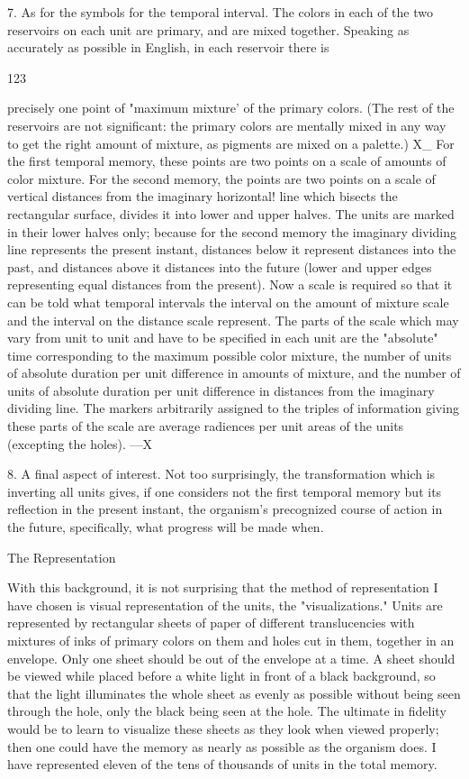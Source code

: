 \documentclass[10pt,twoside]{memoir}
\begin{document}
\begin{enumerate}
{{{{{{{{{{{{{{{{7. As for the symbols for the temporal interval. The colors in each of 
the two reservoirs on each unit are primary, and are mixed together. 
Speaking as accurately as possible in English, in each reservoir there is 


123 


precisely one point of "maximum mixture' of the primary colors. (The rest 
of the reservoirs are not significant: the primary colors are mentally mixed in 
any way to get the right amount of mixture, as pigments are mixed on a 
palette.) X_ For the first temporal memory, these points are two points on a 
scale of amounts of color mixture. For the second memory, the points are 
two points on a scale of vertical distances from the imaginary horizontal! line 
which bisects the rectangular surface, divides it into lower and upper halves. 
The units are marked in their lower halves only; because for the second 
memory the imaginary dividing line represents the present instant, distances 
below it represent distances into the past, and distances above it distances 
into the future (lower and upper edges representing equal distances from the 
present). Now a scale is required so that it can be told what temporal 
intervals the interval on the amount of mixture scale and the interval on the 
distance scale represent. The parts of the scale which may vary from unit to 
unit and have to be specified in each unit are the "absolute" time 
corresponding to the maximum possible color mixture, the number of units 
of absolute duration per unit difference in amounts of mixture, and the 
number of units of absolute duration per unit difference in distances from 
the imaginary dividing line. The markers arbitrarily assigned to the triples of 
information giving these parts of the scale are average radiences per unit 
areas of the units (excepting the holes). —X 

8. A final aspect of interest. Not too surprisingly, the transformation 
which is inverting all units gives, if one considers not the first temporal 
memory but its reflection in the present instant, the organism's precognized 
course of action in the future, specifically, what progress will be made when. 


The Representation 

With this background, it is not surprising that the method of 
representation I have chosen is visual representation of the units, the 
"visualizations." Units are represented by rectangular sheets of paper of 
different translucencies with mixtures of inks of primary colors on them and 
holes cut in them, together in an envelope. Only one sheet should be out of 
the envelope at a time. A sheet should be viewed while placed before a white 
light in front of a black background, so that the light illuminates the whole 
sheet as evenly as possible without being seen through the hole, only the 
black being seen at the hole. The ultimate in fidelity would be to learn to 
visualize these sheets as they look when viewed properly; then one could 
have the memory as nearly as possible as the organism does. I have 
represented eleven of the tens of thousands of units in the total memory. 


}}}}}}}}}}}}}}}}
\end{enumerate}
\end{document}
